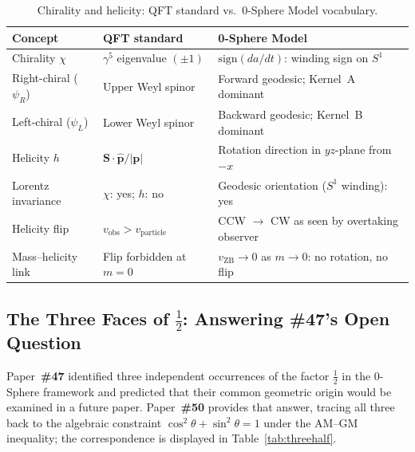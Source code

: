\documentclass[12pt,letterpaper]{article}
\newcommand{\paperno}[1]{\textbf{\#{}#1}}
\newcommand{\vZB}{v_{\mathrm{ZB}}}
\begin{document}
\begin{table}[h!]
\centering
\renewcommand{\arraystretch}{1.4}
\begin{tabular}{p{3.2cm}p{4.3cm}p{5.5cm}}
\toprule
\textbf{Concept} & \textbf{QFT standard} & \textbf{0-Sphere Model} \\
\midrule
Chirality $\chi$ & $\gamma^5$ eigenvalue $(\pm 1)$ &
  $\mathrm{sign}(da/dt)$: winding sign on $S^1$ \\
Right-chiral ($\psi_R$) & Upper Weyl spinor &
  Forward geodesic; Kernel~A dominant \\
Left-chiral ($\psi_L$) & Lower Weyl spinor &
  Backward geodesic; Kernel~B dominant \\
Helicity $h$ & $\mathbf{S}\cdot\hat{\mathbf{p}}/|\mathbf{p}|$ &
  Rotation direction in $yz$-plane from $-x$ \\
Lorentz invariance & $\chi$: yes; $h$: no &
  Geodesic orientation ($S^1$ winding): yes \\
Helicity flip & $v_{\mathrm{obs}} > v_{\mathrm{particle}}$ &
  CCW $\to$ CW as seen by overtaking observer \\
Mass--helicity link & Flip forbidden at $m=0$ &
  $\vZB\to 0$ as $m\to 0$: no rotation, no flip \\
\bottomrule
\end{tabular}
\caption{Chirality and helicity: QFT standard vs.\ 0-Sphere Model vocabulary.}
\label{tab:chirality}
\end{table}

\subsection{\texorpdfstring{The Three Faces of $\frac{1}{2}$: Answering \#47's Open Question}{The Three Faces of 1/2: Answering \#47's Open Question}}

Paper~\paperno{47} identified three independent occurrences of the factor $\frac{1}{2}$
in the 0-Sphere framework and predicted that their common geometric origin would be
examined in a future paper. Paper~\paperno{50} provides that answer, tracing all three back to the algebraic constraint $\cos^2\theta + \sin^2\theta = 1$ under the AM--GM inequality; the correspondence is displayed in Table~\ref{tab:threehalf}.
\end{document}
